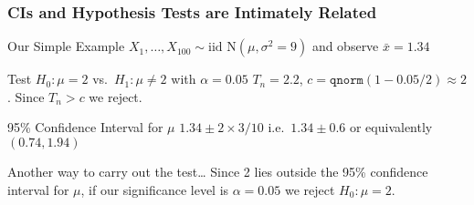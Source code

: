 \begin{frame}
  \frametitle{CIs and Hypothesis Tests are Intimately Related}

  \begin{block}{Our Simple Example}
    $X_1, \dots, X_{100} \sim \mbox{iid N}(\mu, \sigma^2 = 9)$ and observe $\bar{x} = 1.34$ 
  \end{block}

  \pause

  \begin{block}{Test $H_0\colon \mu = 2$ vs.\ $H_1\colon \mu \neq 2$ with $\alpha = 0.05$}
    $T_n = 2.2$, $c = \texttt{qnorm}(1 - 0.05/2) \approx 2$. Since $T_n>c$ we reject.
    
  \end{block}

  \pause

  \begin{block}{95\% Confidence Interval for $\mu$} 
    $1.34 \pm 2 \times 3 / 10$ i.e.\ $1.34 \pm 0.6$ or equivalently $(0.74, 1.94)$
  \end{block}

  \pause

  \begin{block}{Another way to carry out the test\dots}
   Since 2 lies outside the 95\% confidence interval for $\mu$, if our significance level is $\alpha = 0.05$ we reject $H_0\colon \mu = 2$.
  \end{block}

\end{frame}
